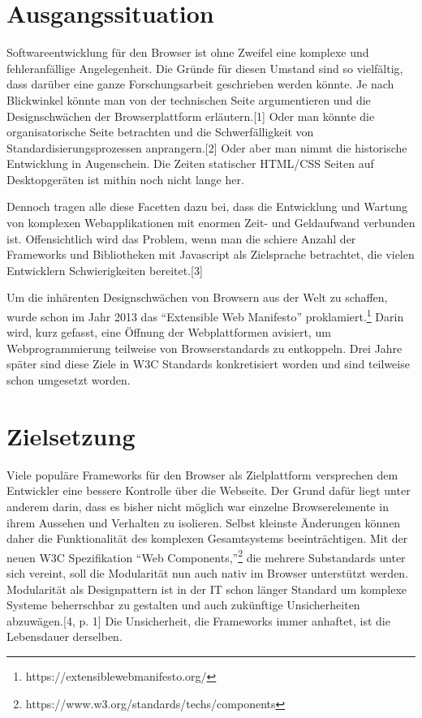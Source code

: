 \section{Ausgangssituation}\label{ausgangssituation}

Softwareentwicklung für den Browser ist ohne Zweifel eine komplexe und
fehleranfällige Angelegenheit. Die Gründe für diesen Umstand sind so
vielfältig, dass darüber eine ganze Forschungsarbeit geschrieben werden
könnte. Je nach Blickwinkel könnte man von der technischen Seite
argumentieren und die Designschwächen der Browserplattform
erläutern.{[}1{]} Oder man könnte die organisatorische Seite betrachten
und die Schwerfälligkeit von Standardisierungsprozessen
anprangern.{[}2{]} Oder aber man nimmt die historische Entwicklung in
Augenschein. Die Zeiten statischer HTML/CSS Seiten auf Desktopgeräten
ist mithin noch nicht lange her.

Dennoch tragen alle diese Facetten dazu bei, dass die Entwicklung und
Wartung von komplexen Webapplikationen mit enormen Zeit- und Geldaufwand
verbunden ist. Offensichtlich wird das Problem, wenn man die schiere
Anzahl der Frameworks und Bibliotheken mit Javascript als Zielsprache
betrachtet, die vielen Entwicklern Schwierigkeiten bereitet.{[}3{]}

Um die inhärenten Designschwächen von Browsern aus der Welt zu schaffen,
wurde schon im Jahr 2013 das ``Extensible Web Manifesto''
proklamiert.\footnote{https://extensiblewebmanifesto.org/} Darin wird,
kurz gefasst, eine Öffnung der Webplattformen avisiert, um
Webprogrammierung teilweise von Browserstandards zu entkoppeln. Drei
Jahre später sind diese Ziele in W3C Standards konkretisiert worden und
sind teilweise schon umgesetzt worden.

\section{Zielsetzung}\label{zielsetzung}

Viele populäre Frameworks für den Browser als Zielplattform versprechen
dem Entwickler eine bessere Kontrolle über die Webseite. Der Grund dafür
liegt unter anderem darin, dass es bisher nicht möglich war einzelne
Browserelemente in ihrem Aussehen und Verhalten zu isolieren. Selbst
kleinste Änderungen können daher die Funktionalität des komplexen
Gesamtsystems beeinträchtigen. Mit der neuen W3C Spezifikation ``Web
Components,''\footnote{https://www.w3.org/standards/techs/components}
die mehrere Substandards unter sich vereint, soll die Modularität nun
auch nativ im Browser unterstützt werden. Modularität als Designpattern
ist in der IT schon länger Standard um komplexe Systeme beherrschbar zu
gestalten und auch zukünftige Unsicherheiten abzuwägen.{[}4, p. 1{]} Die
Unsicherheit, die Frameworks immer anhaftet, ist die Lebensdauer
derselben.

